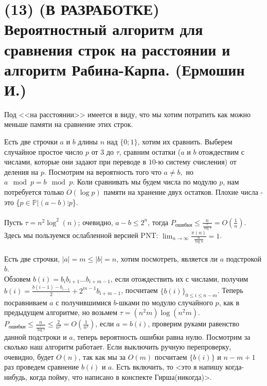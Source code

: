 \section{(13) (В РАЗРАБОТКЕ) Вероятностный алгоритм для сравнения строк на расстоянии и алгоритм Рабина-Карпа. (Ермошин И.)}


Под <<на расстоянии>> имеется в виду, что мы хотим потратить как можно меньше памяти на сравнение этих строк.

Есть две строчки $a$ и $b$ длины $n$ над $\{0;1\}$, хотим их сравнить. Выберем случайное простое число $p$ от $3$ до $\tau$, сравним остатки ($a$ и $b$ отождествим с числами, которые они задают при переводе в $10$-ю систему счисления) от деления на $p$. Посмотрим на вероятность того что $a\neq b,$ но $a\mod{p}=b\mod{p}$. Коли сравнивать мы будем числа по модулю $p$, нам потребуется только $O(\log p)$ памяти на хранение двух остатков.
Плохие числа - это \{$p\in\mathbb{P} | (a-b)\vdots p$\}.
\\
\\Пусть $\tau=n^2 \log^2(n)$; очевидно, $a-b\le 2^n$, тогда $P_{\text{ошибки}}\le\frac{n}{\frac{\tau}{\log\tau}}=O(\frac{1}{n})$. Здесь мы пользуемся ослабленной версией PNT: $\lim_{n\to\infty} \frac{\pi(n)}{\frac{n}{\log n}}=1$.
\\
\\
Есть две строчки, $|a|=m\le|b|=n$, хотим посмотреть, является ли $a$ подстрокой $b$.
\\Обзовем $b(i)=b_i b_{i+1}\ldots b_{i+m-1}$, если отождествить их с числами, получим $b(i)=\frac{b(i-1)-b_{i-1}}{2}+2^{m-1} b_{i+m-1}$, посчитаем $\{b(i)\}_{0\le i\le n-m}$. Теперь посравниваем $a$ с получившимися $b$-шками по модулю случайного $p$, как в предыдущем алгоритме, но возьмем $\tau=(n^2m)\log(n^2m)$.$P_{\text{ошибки}}\le\frac{n}{\frac{\tau}{\log\tau}}\le\frac{2}{n^2}=O(\frac{1}{n^2})$, если $a=b(i)$, проверим руками равенство данной подстроки и $a$, теперь вероятность ошибки равна нулю. Посмотрим за сколько наш алгоритм работает. Если выключить ручную перепроверку, очевидно, будет $O(n)$, так как мы за $O(m)$ посчитаем $\{b(i)\}$ и $n-m+1$ раз проведем сравнение $b(i)$ и $a$. Есть включить, то <это я напишу когда-нибудь, когда пойму, что написано в конспекте Гирша(никогда)>.
